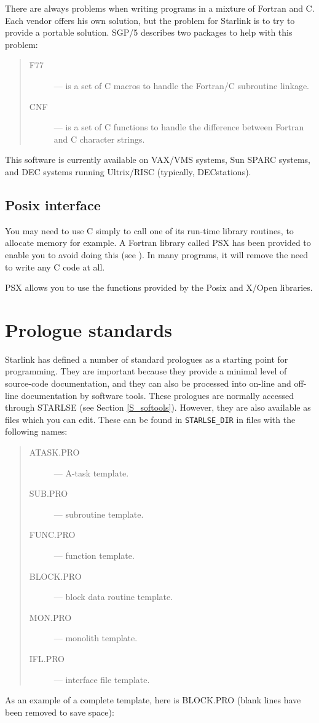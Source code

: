 There are always problems when writing programs in a mixture of Fortran and C.
Each vendor offers his own solution, but the problem for Starlink is to
try to provide a portable solution.
SGP/5 describes two packages to help with this problem:
\begin{quote}
\begin{description}
\item [F77] --- is a set of C macros to handle the Fortran/C subroutine
 linkage.
\item [CNF] --- is a set of C functions to handle the difference between
 Fortran and C character strings.
\end{description}
\end{quote}
This software is currently available on VAX/VMS systems, Sun SPARC systems, and
DEC systems running Ultrix/RISC (typically, DECstations).

\subsection{Posix interface}

You may need to use C simply to call one of its run-time library routines,
to allocate memory for example.
A Fortran library called PSX has been provided to enable you to avoid doing
this (see ).
In many programs, it will remove the need to write any C code at all.

PSX allows you to use the functions provided by the Posix and X/Open libraries.

\section{Prologue standards}
\label{S_standprols}

Starlink has defined a number of standard prologues as a starting point for
programming.
They are important because they provide a minimal level of source-code
documentation, and they can also be processed into on-line and off-line
documentation by software tools.
These prologues are normally accessed through STARLSE (see Section
\ref{S_softools}).
However, they are also available as files which you can edit.
These can be found in \verb+STARLSE_DIR+ in files with the following names:
\begin{quote}
\begin{description}
\item [ATASK.PRO] --- A-task template.
\item [SUB.PRO] --- subroutine template.
\item [FUNC.PRO] --- function template.
\item [BLOCK.PRO] --- block data routine template.
\item [MON.PRO] --- monolith template.
\item [IFL.PRO] --- interface file template.
\end{description}
\end{quote}
As an example of a complete template, here is BLOCK.PRO (blank lines have been
removed to save space):

